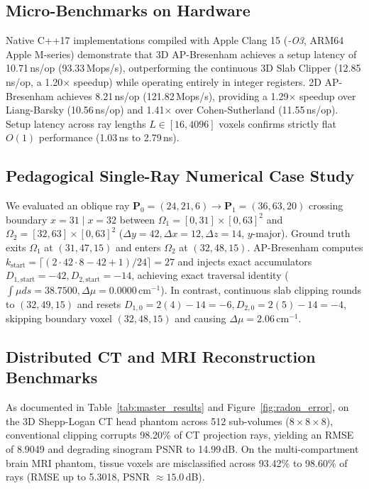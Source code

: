 \documentclass[11pt]{article}
\begin{document}
\subsection*{Micro-Benchmarks on Hardware}
Native C++17 implementations compiled with Apple Clang 15 (\textit{-O3}, ARM64 Apple M-series) demonstrate that 3D AP-Bresenham achieves a setup latency of 10.71\,ns/op (93.33\,Mops/s), outperforming the continuous 3D Slab Clipper (12.85\,ns/op, a 1.20$\times$ speedup) while operating entirely in integer registers. 2D AP-Bresenham achieves 8.21\,ns/op (121.82\,Mops/s), providing a 1.29$\times$ speedup over Liang-Barsky (10.56\,ns/op) and 1.41$\times$ over Cohen-Sutherland (11.55\,ns/op). Setup latency across ray lengths $L \in [16, 4096]$ voxels confirms strictly flat $O(1)$ performance (1.03\,ns to 2.79\,ns).

\subsection*{Pedagogical Single-Ray Numerical Case Study}
We evaluated an oblique ray $\mathbf{P}_0 = (24, 21, 6) \to \mathbf{P}_1 = (36, 63, 20)$ crossing boundary $x = 31 \mid x = 32$ between $\Omega_1 = [0, 31] \times [0, 63]^2$ and $\Omega_2 = [32, 63] \times [0, 63]^2$ ($\Delta y = 42, \Delta x = 12, \Delta z = 14$, $y$-major). Ground truth exits $\Omega_1$ at $(31, 47, 15)$ and enters $\Omega_2$ at $(32, 48, 15)$. AP-Bresenham computes $k_{\mathrm{start}} = \lceil (2 \cdot 42 \cdot 8 - 42 + 1)/24 \rceil = 27$ and injects exact accumulators $D_{1,\mathrm{start}} = -42, D_{2,\mathrm{start}} = -14$, achieving exact traversal identity ($\int \mu ds = 38.7500, \Delta \mu = 0.0000$\,cm$^{-1}$). In contrast, continuous slab clipping rounds to $(32, 49, 15)$ and resets $D_{1,0} = 2(4) - 14 = -6, D_{2,0} = 2(5) - 14 = -4$, skipping boundary voxel $(32, 48, 15)$ and causing $\Delta \mu = 2.06$\,cm$^{-1}$.

\subsection*{Distributed CT and MRI Reconstruction Benchmarks}
As documented in Table~\ref{tab:master_results} and Figure~\ref{fig:radon_error}, on the 3D Shepp-Logan CT head phantom across 512 sub-volumes ($8 \times 8 \times 8$), conventional clipping corrupts 98.20\% of CT projection rays, yielding an RMSE of 8.9049 and degrading sinogram PSNR to 14.99\,dB. On the multi-compartment brain MRI phantom, tissue voxels are misclassified across 93.42\% to 98.60\% of rays (RMSE up to 5.3018, PSNR $\approx 15.0$\,dB).
\end{document}
